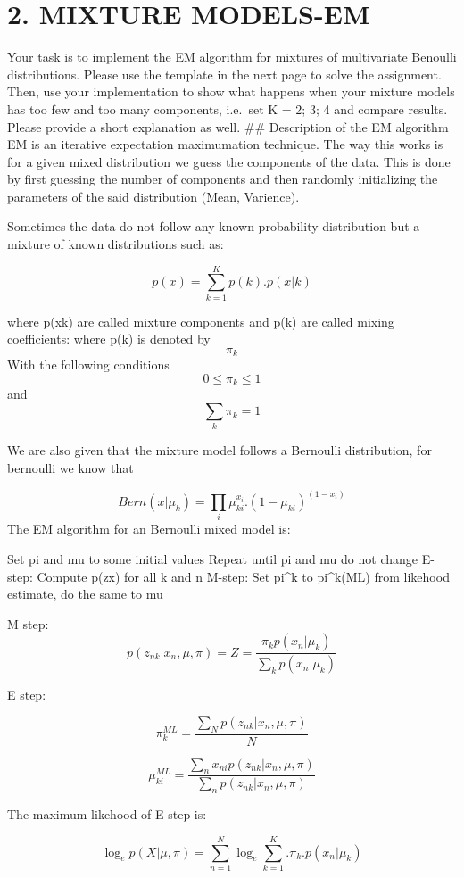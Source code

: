 \documentclass[]{article}
\begin{document}
\section{2. MIXTURE MODELS-EM}\label{mixture-models-em}

Your task is to implement the EM algorithm for mixtures of multivariate
Benoulli distributions. Please use the template in the next page to
solve the assignment. Then, use your implementation to show what happens
when your mixture models has too few and too many components, i.e.~set K
= 2; 3; 4 and compare results. Please provide a short explanation as
well. \#\# Description of the EM algorithm EM is an iterative
expectation maximumation technique. The way this works is for a given
mixed distribution we guess the components of the data. This is done by
first guessing the number of components and then randomly initializing
the parameters of the said distribution (Mean, Varience).

Sometimes the data do not follow any known probability distribution but
a mixture of known distributions such as:

\[p(x) = \sum_{k=1}^{K} p(k).p(x|k) \]

where p(x\textbar{}k) are called mixture components and p(k) are called
mixing coefficients: where p(k) is denoted by \[ \pi_{k} \] With the
following conditions \[ 0\le\pi_{k}\le1 \] and
\[ \sum_{k} \pi_{k} = 1 \]

We are also given that the mixture model follows a Bernoulli
distribution, for bernoulli we know that

\[Bern(x|\mu_{k}) = \prod_{i} \mu^{x_{i}}_{ki} . ( 1 - \mu_{ki} )^{(1-x_{i})} \]
The EM algorithm for an Bernoulli mixed model is:

Set pi and mu to some initial values Repeat until pi and mu do not
change E-step: Compute p(z\textbar{}x) for all k and n M-step: Set
pi\^{}k to pi\^{}k(ML) from likehood estimate, do the same to mu

M step:
\[p(z_{nk}|x_n,\mu,\pi) = Z = \frac{\pi_k p(x_n|\mu_k)}{\sum_k p(x_n|\mu_k)}\]

E step:

\[\pi^{ML}_k = \frac{\sum_N p(z_{nk}|x_n,\mu,\pi)}{N} \]

\[ \mu^{ML}_{ki}= \frac{\sum_n x_{ni} p(z_{nk}|x_n,\mu,\pi)}{\sum_n p(z_{nk}|x_n,\mu,\pi)}  \]

The maximum likehood of E step is:

\[ \log_ep(X|\mu,\pi) = \sum^{N}_{n=1} \log_e \sum^{K}_{k=1}.\pi_{k}.p(x_n|\mu_k) \]
\end{document}
